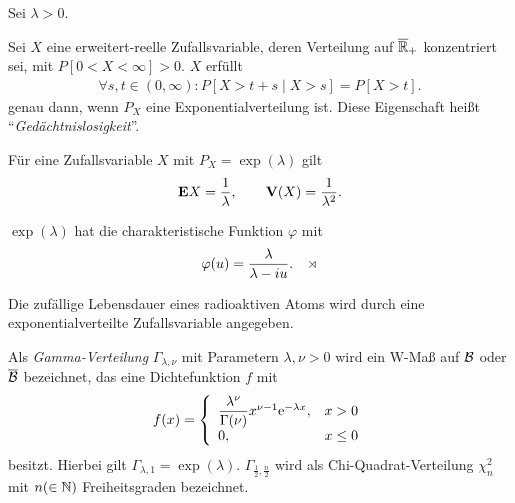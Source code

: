\begin{prop}
\label{prop:7.6}
Sei $\lambda >0$.
\begin{propenum}
\item
Sei $X$ eine erweitert-reelle Zufallsvariable, deren Verteilung auf
$\overline{\mathbb{R}}_{+}$ konzentriert sei, mit $P[0<X<\infty] >0$.
$X$ erfüllt
\begin{align*}
\forall s,t\in (0,\infty ) :
P[X>t+s\mid X>s] = P[X>t].
\end{align*}
genau dann, wenn $P_{X}$  eine Exponentialverteilung ist. Diese Eigenschaft
heißt ``\emph{Gedächtnislosigkeit}''.
\item Für eine Zufallsvariable $X$ mit $P_{X} = \exp (\lambda ) $ gilt
\begin{align*}
\textbf{E} X = \frac{1}{\lambda}, \qquad \textbf{V}(X) = 
\frac{1}{\lambda ^ {2}}.
\end{align*}
\item
$\exp (\lambda )$ hat die charakteristische Funktion $\varphi $  mit
\begin{align*}
\ph (u) = {\displaystyle \frac{\lambda}{\lambda -iu}}.\fishhere
\end{align*}
\end{propenum}
\end{prop}

\begin{bem}
\label{bem:7.6}
Die zufällige Lebensdauer eines radioaktiven Atoms wird
durch eine exponentialverteilte Zufallsvariable angegeben.\maphere
\end{bem}

\begin{defn}
\label{defn:7.8}
Als \emph{Gamma-Verteilung} $\Gamma _{\lambda, \nu}$ mit
Parametern $\lambda, \nu >0$ wird ein W-Maß auf ${\mathcal{B}}$ oder $\overline{\cal
B}$ bezeichnet, das eine Dichtefunktion $f$ mit
\begin{align*}
f(x) = \left\{ \begin{array}{ll}
{\displaystyle\frac{\lambda ^ {\nu}}{\Gamma (\nu)}}x^ {\nu -1} \mathrm{e}^ {-\lambda
x},& x>0\\[2mm]
0 ,& x\leq 0
\end{array}\right.
\end{align*}
besitzt. Hierbei gilt $\Gamma _{\lambda,1} = \exp (\lambda)$. $\Gamma
_{\frac{1}{2}, \frac{n}{2}}$ wird als Chi-Quadrat-Verteilung $\chi ^ {2}_{n}$ mit $n (\in
\mathbb{N})$ Freiheitsgraden bezeichnet.\fishhere
\end{defn}

